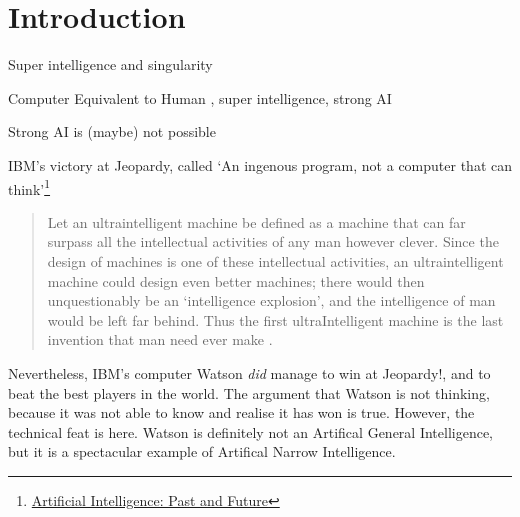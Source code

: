 \documentclass[12pt]{article}
\begin{document}
\pagebreak



\section*{Introduction}\label{introduction}

Super intelligence and singularity \cite{Kurzweil}

Computer Equivalent to Human , super intelligence, strong AI \cite{Turing}


Strong AI is (maybe) not possible \cite{ChineseRoom}

IBM's victory at Jeopardy, called \lq An ingenous program, not a computer that
can think\rq \footnote{
\href{http://cacm.acm.org/magazines/2012/1/144824-artificial-intelligence-past-and-future/fulltext}
{Artificial Intelligence: Past and Future}}



\begin{quotation}
   Let an ultraintelligent machine be defined as a machine that can far surpass
   all the intellectual activities of any man however clever. Since the design
   of machines is one of these intellectual activities, an ultraintelligent
   machine could design even better machines; there would then unquestionably be
   an \lq intelligence explosion\rq , and the intelligence of man would be left
   far behind. Thus the first ultraIntelligent machine is the last invention
   that man need ever make \cite{Good}.
\end{quotation}



Nevertheless, IBM's computer Watson {\em did} manage to win at Jeopardy!, and to
beat the best players in the world. The argument that Watson is not thinking,
because it was not able to know and realise it has won is true. However, the
technical feat is here. Watson is definitely not an Artifical General
Intelligence, but it is a spectacular example of Artifical Narrow Intelligence.
\\
\end{document}
